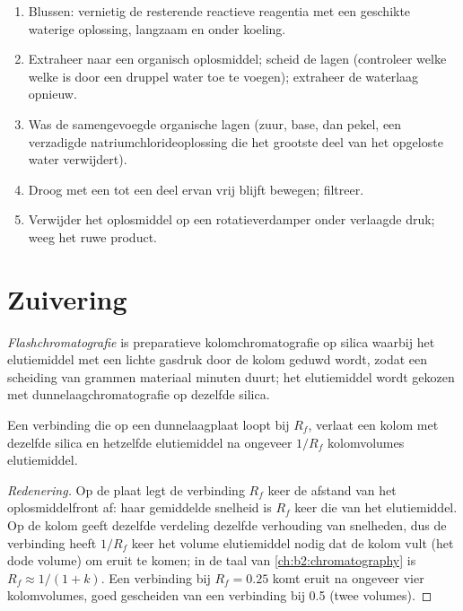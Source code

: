 \begin{method}\label{met:b2:lab-techniques-2:work-up}
\begin{enumerate}
  \item Blussen: vernietig de resterende reactieve reagentia met een geschikte waterige oplossing, langzaam en onder
        koeling.
  \item Extraheer naar een organisch oplosmiddel; scheid de lagen (controleer welke welke is door een druppel
        water toe te voegen); extraheer de waterlaag opnieuw.
  \item Was de samengevoegde organische lagen (zuur, base, dan pekel, een verzadigde natriumchlorideoplossing
        die het grootste deel van het opgeloste water verwijdert).
  \item Droog met een  tot een deel ervan vrij blijft bewegen; filtreer.
  \item Verwijder het oplosmiddel op een rotatieverdamper onder verlaagde druk; weeg het ruwe product.
\end{enumerate}
\end{method}

\section{Zuivering}

\begin{definition}[Flashchromatografie]\label{def:b2:lab-techniques-2:flash}
\emph{Flashchromatografie} is preparatieve kolomchromatografie op silica waarbij
het elutiemiddel met een lichte gasdruk door de kolom geduwd wordt, zodat een scheiding van grammen
materiaal minuten duurt; het elutiemiddel wordt gekozen met dunnelaagchromatografie op dezelfde silica.
\end{definition}

\begin{proposition}[Kolomvolumes]\label{prop:b2:lab-techniques-2:column-volumes}
Een verbinding die op een dunnelaagplaat loopt bij $R_f$, verlaat een kolom met dezelfde silica en hetzelfde elutiemiddel na
ongeveer $1/R_f$ kolomvolumes elutiemiddel.
\end{proposition}

\begin{proof}[Redenering]
Op de plaat legt de verbinding $R_f$ keer de afstand van het oplosmiddelfront af: haar gemiddelde snelheid is $R_f$
keer die van het elutiemiddel. Op de kolom geeft dezelfde verdeling dezelfde verhouding van snelheden, dus de
verbinding heeft $1/R_f$ keer het volume elutiemiddel nodig dat de kolom vult (het dode volume) om eruit te
komen; in de taal van \cref{ch:b2:chromatography} is $R_f \approx 1/(1 + k)$. Een verbinding bij $R_f = 0.25$
komt eruit na ongeveer vier kolomvolumes, goed gescheiden van een verbinding bij 0.5 (twee volumes).
\end{proof}

